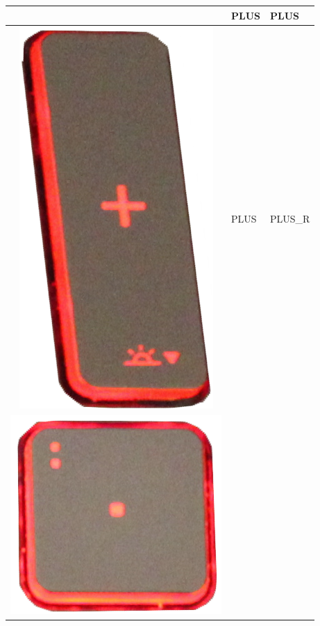 \begin{longtable}{|cll|}
\begin{minipage}[c]{.4\textwidth}
\vspace{0.2cm}
\end{minipage} & PLUS & PLUS\\
\hline
\begin{minipage}[c]{.4\textwidth}
\vspace{0.2cm}
\includegraphics[scale=0.08]{Images/KeyMapping/PLUS_R}
\vspace{0.2cm}
\end{minipage} & PLUS & PLUS\_R\\
\hline
\begin{minipage}[c]{.4\textwidth}
\vspace{0.2cm}
\includegraphics[scale=0.08]{Images/KeyMapping/POINT}

\end{minipage}
\end{longtable}

